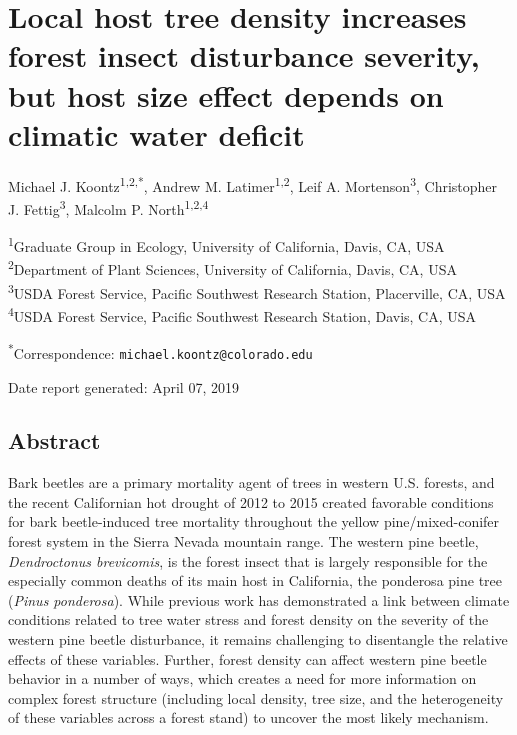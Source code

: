\documentclass[]{article}
\title{}
\author{}
\date{}
\begin{document}
\section{Local host tree density increases forest insect disturbance
severity, but host size effect depends on climatic water
deficit}\label{local-host-tree-density-increases-forest-insect-disturbance-severity-but-host-size-effect-depends-on-climatic-water-deficit}

Michael J. Koontz\textsuperscript{1,2,*}, Andrew M.
Latimer\textsuperscript{1,2}, Leif A. Mortenson\textsuperscript{3},
Christopher J. Fettig\textsuperscript{3}, Malcolm P.
North\textsuperscript{1,2,4}

\textsuperscript{1}Graduate Group in Ecology, University of California,
Davis, CA, USA\\
\textsuperscript{2}Department of Plant Sciences, University of
California, Davis, CA, USA\\
\textsuperscript{3}USDA Forest Service, Pacific Southwest Research
Station, Placerville, CA, USA\\
\textsuperscript{4}USDA Forest Service, Pacific Southwest Research
Station, Davis, CA, USA

\textsuperscript{*}Correspondence: \texttt{michael.koontz@colorado.edu}

Date report generated: April 07, 2019

\subsection{Abstract}\label{abstract}

Bark beetles are a primary mortality agent of trees in western U.S.
forests, and the recent Californian hot drought of 2012 to 2015 created
favorable conditions for bark beetle-induced tree mortality throughout
the yellow pine/mixed-conifer forest system in the Sierra Nevada
mountain range. The western pine beetle, \emph{Dendroctonus brevicomis},
is the forest insect that is largely responsible for the especially
common deaths of its main host in California, the ponderosa pine tree
(\emph{Pinus ponderosa}). While previous work has demonstrated a link
between climate conditions related to tree water stress and forest
density on the severity of the western pine beetle disturbance, it
remains challenging to disentangle the relative effects of these
variables. Further, forest density can affect western pine beetle
behavior in a number of ways, which creates a need for more information
on complex forest structure (including local density, tree size, and the
heterogeneity of these variables across a forest stand) to uncover the
most likely mechanism.
\end{document}
